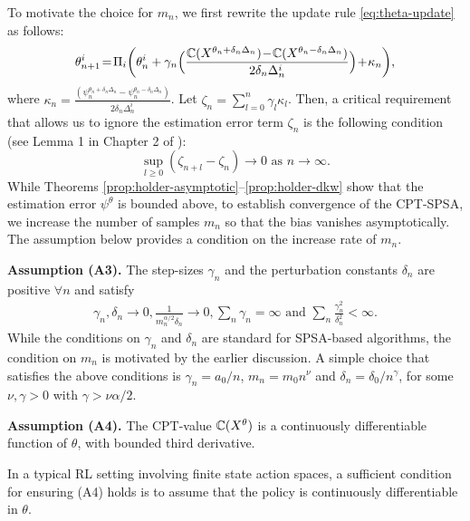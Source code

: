 To motivate the choice for $m_n$, we first rewrite the update rule \eqref{eq:theta-update} as follows:
\begin{align*}
\theta^{i}_{n+1} \! = \! \Pi_{i}\bigg( \theta^{i}_n +  \gamma_n \Big( \frac{\mathbb{C}(X^{\theta_n +\delta_n\Delta_n}) \!-\! \mathbb{C}(X^{\theta_n-\delta_n\Delta_n})}{2\delta_n\Delta_n^{i}}\Big)\! +\! \kappa_n\bigg),
\end{align*}
where $\kappa_n = \frac{(\psi_n^{\theta_n +\delta_n\Delta_n} - \psi_n^{\theta_n-\delta_n\Delta_n})}{2\delta_n\Delta_n^{i}}$.
Let $\zeta_n = \sum_{l = 0}^{n} \gamma_l \kappa_{l}$. Then, a critical requirement that allows us to ignore the estimation error term $\zeta_n$ is the following condition (see Lemma 1 in Chapter 2 of \cite{borkar2008stochastic}): 
$$\sup_{l\ge0} \left (\zeta_{n+l} - \zeta_n \right) \rightarrow 0 \text{ as } n\rightarrow\infty.$$ 
While Theorems \ref{prop:holder-asymptotic}--\ref{prop:holder-dkw} show that the estimation error $\psi^\theta$ is bounded above, to establish convergence of the CPT-SPSA, we increase the number of samples $m_n$ so that the bias vanishes asymptotically.  The assumption below provides a condition on the increase rate of $m_n$.

\noindent\textbf{Assumption (A3).}  The step-sizes $\gamma_n$ and the perturbation constants 
$\delta_n$ are positive $\forall n$ and satisfy
\begin{align*}
\gamma_n, \delta_n \rightarrow 0, \frac{1}{m_n^{\alpha/2}\delta_n}\rightarrow 0,  \sum_n \gamma_n=\infty \text{ and } \sum_n \frac{\gamma_n^2}{\delta_n^2}<\infty. 
\end{align*}
While the conditions on $\gamma_n$ and $\delta_n$ are standard for SPSA-based algorithms, the condition on $m_n$ is motivated by the earlier discussion. 
A simple choice that satisfies the above conditions is $\gamma_n = a_0/n$, $m_n = m_0 n^\nu$ and $\delta_n = \delta_0/{n^\gamma}$, for some $\nu, \gamma >0$ with $\gamma > \nu\alpha/2$.

\noindent\textbf{Assumption (A4).}  The CPT-value $\mathbb{C}(X^\theta)$ is a continuously differentiable function of $\theta$, with bounded third derivative.

In a typical RL setting involving finite state action spaces, a sufficient condition for ensuring (A4) holds is to assume that the policy is continuously differentiable in $\theta$. 

